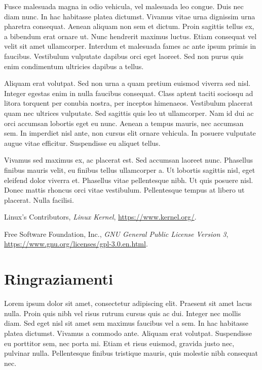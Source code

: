 \documentclass[12pt,a4paper,openright,twoside]{report}
\begin{document}
Fusce malesuada magna in odio vehicula, vel malesuada leo congue. Duis nec diam nunc. In hac habitasse platea dictumst. Vivamus vitae urna dignissim urna pharetra consequat. Aenean aliquam non sem et dictum. Proin sagittis tellus ex, a bibendum erat ornare ut. Nunc hendrerit maximus luctus. Etiam consequat vel velit sit amet ullamcorper. Interdum et malesuada fames ac ante ipsum primis in faucibus. Vestibulum vulputate dapibus orci eget laoreet. Sed non purus quis enim condimentum ultricies dapibus a tellus.

Aliquam erat volutpat. Sed non urna a quam pretium euismod viverra sed nisl. Integer egestas enim in nulla faucibus consequat. Class aptent taciti sociosqu ad litora torquent per conubia nostra, per inceptos himenaeos. Vestibulum placerat quam nec ultrices vulputate. Sed sagittis quis leo ut ullamcorper. Nam id dui ac orci accumsan lobortis eget eu nunc. Aenean a tempus mauris, nec accumsan sem. In imperdiet nisl ante, non cursus elit ornare vehicula. In posuere vulputate augue vitae efficitur. Suspendisse eu aliquet tellus.

Vivamus sed maximus ex, ac placerat est. Sed accumsan laoreet nunc. Phasellus finibus mauris velit, eu finibus tellus ullamcorper a. Ut lobortis sagittis nisl, eget eleifend dolor viverra et. Phasellus vitae pellentesque nibh. Ut quis posuere nisl. Donec mattis rhoncus orci vitae vestibulum. Pellentesque tempus at libero ut placerat. Nulla facilisi.

\begin{thebibliography}{99}
	Linux's Contributors,
	\textit{Linux Kernel},
	\url{https://www.kernel.org/}.

	Free Software Foundation, Inc.,
	\textit{GNU General Public License Version 3},
	\url{https://www.gnu.org/licenses/gpl-3.0.en.html}.

\end{thebibliography}

\chapter*{Ringraziamenti}
Lorem ipsum dolor sit amet, consectetur adipiscing elit. Praesent sit amet lacus nulla. Proin quis nibh vel risus rutrum cursus quis ac dui. Integer nec mollis diam. Sed eget nisl sit amet sem maximus faucibus vel a sem. In hac habitasse platea dictumst. Vivamus a commodo ante. Aliquam erat volutpat. Suspendisse eu porttitor sem, nec porta mi. Etiam et risus euismod, gravida justo nec, pulvinar nulla. Pellentesque finibus tristique mauris, quis molestie nibh consequat nec.
\end{document}
